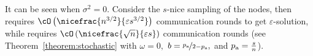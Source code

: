 \documentclass{article}
\newcommand*{\probavailable}{\ensuremath{p_{\textnormal{a}}}}
\begin{document}
\begin{table}
\begin{threeparttable}
\begin{tablenotes}
      \item [{\color{blue}(e)}] It can be seen when $\sigma^2 = 0.$ Consider the $s$-nice sampling of the nodes, then  requires $\cO\left(\nicefrac{n^{3/2}}{\varepsilon s^{3/2}}\right)$ communication rounds to get $\varepsilon$-solution, while  requires $\cO\left(\nicefrac{\sqrt{n}}{\varepsilon s}\right)$ communication rounds (see Theorem~\ref{theorem:stochastic} with $\omega = 0,$ $b = \nicefrac{\probavailable}{2 - \probavailable},$ and $\probavailable = \frac{s}{n}$).
    \end{tablenotes}
\end{threeparttable}
\end{table}
\end{document}
